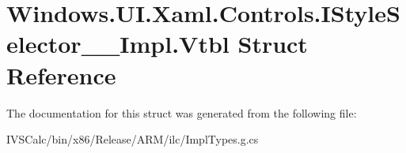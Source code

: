 \hypertarget{struct_windows_1_1_u_i_1_1_xaml_1_1_controls_1_1_i_style_selector_____impl_1_1_vtbl}{}\section{Windows.\+U\+I.\+Xaml.\+Controls.\+I\+Style\+Selector\+\_\+\+\_\+\+Impl.\+Vtbl Struct Reference}
\label{struct_windows_1_1_u_i_1_1_xaml_1_1_controls_1_1_i_style_selector_____impl_1_1_vtbl}


The documentation for this struct was generated from the following file\+:\begin{DoxyCompactItemize}
\item 
I\+V\+S\+Calc/bin/x86/\+Release/\+A\+R\+M/ilc/Impl\+Types.\+g.\+cs\end{DoxyCompactItemize}
